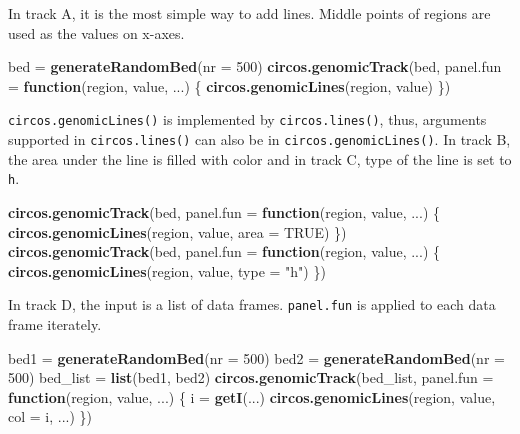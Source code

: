 \documentclass[]{book}
\newenvironment{Shaded}{\begin{snugshade}}{\end{snugshade}}
\newcommand{\KeywordTok}[1]{\textcolor[rgb]{0.13,0.29,0.53}{\textbf{#1}}}
\newcommand{\DataTypeTok}[1]{\textcolor[rgb]{0.13,0.29,0.53}{#1}}
\newcommand{\DecValTok}[1]{\textcolor[rgb]{0.00,0.00,0.81}{#1}}
\newcommand{\StringTok}[1]{\textcolor[rgb]{0.31,0.60,0.02}{#1}}
\newcommand{\OtherTok}[1]{\textcolor[rgb]{0.56,0.35,0.01}{#1}}
\newcommand{\ControlFlowTok}[1]{\textcolor[rgb]{0.13,0.29,0.53}{\textbf{#1}}}
\newcommand{\NormalTok}[1]{#1}
\theoremstyle{definition}
\theoremstyle{definition}
\theoremstyle{remark}
\begin{document}
In track A, it is the most simple way to add lines. Middle points of
regions are used as the values on x-axes.

\begin{Shaded}
\begin{Highlighting}[]
\NormalTok{bed =}\StringTok{ }\KeywordTok{generateRandomBed}\NormalTok{(}\DataTypeTok{nr =} \DecValTok{500}\NormalTok{)}
\KeywordTok{circos.genomicTrack}\NormalTok{(bed, }
    \DataTypeTok{panel.fun =} \ControlFlowTok{function}\NormalTok{(region, value, ...) \{}
        \KeywordTok{circos.genomicLines}\NormalTok{(region, value)}
\NormalTok{\})}
\end{Highlighting}
\end{Shaded}

\texttt{circos.genomicLines()} is implemented by
\texttt{circos.lines()}, thus, arguments supported in
\texttt{circos.lines()} can also be in \texttt{circos.genomicLines()}.
In track B, the area under the line is filled with color and in track C,
type of the line is set to \texttt{h}.

\begin{Shaded}
\begin{Highlighting}[]
\KeywordTok{circos.genomicTrack}\NormalTok{(bed, }
    \DataTypeTok{panel.fun =} \ControlFlowTok{function}\NormalTok{(region, value, ...) \{}
        \KeywordTok{circos.genomicLines}\NormalTok{(region, value, }\DataTypeTok{area =} \OtherTok{TRUE}\NormalTok{)}
\NormalTok{\})}
\KeywordTok{circos.genomicTrack}\NormalTok{(bed, }
    \DataTypeTok{panel.fun =} \ControlFlowTok{function}\NormalTok{(region, value, ...) \{}
        \KeywordTok{circos.genomicLines}\NormalTok{(region, value, }\DataTypeTok{type =} \StringTok{"h"}\NormalTok{)}
\NormalTok{\})}
\end{Highlighting}
\end{Shaded}

In track D, the input is a list of data frames. \texttt{panel.fun} is
applied to each data frame iterately.

\begin{Shaded}
\begin{Highlighting}[]
\NormalTok{bed1 =}\StringTok{ }\KeywordTok{generateRandomBed}\NormalTok{(}\DataTypeTok{nr =} \DecValTok{500}\NormalTok{)}
\NormalTok{bed2 =}\StringTok{ }\KeywordTok{generateRandomBed}\NormalTok{(}\DataTypeTok{nr =} \DecValTok{500}\NormalTok{)}
\NormalTok{bed_list =}\StringTok{ }\KeywordTok{list}\NormalTok{(bed1, bed2)}
\KeywordTok{circos.genomicTrack}\NormalTok{(bed_list, }
    \DataTypeTok{panel.fun =} \ControlFlowTok{function}\NormalTok{(region, value, ...) \{}
\NormalTok{        i =}\StringTok{ }\KeywordTok{getI}\NormalTok{(...)}
        \KeywordTok{circos.genomicLines}\NormalTok{(region, value, }\DataTypeTok{col =}\NormalTok{ i, ...)}
\NormalTok{\})}
\end{Highlighting}
\end{Shaded}
\end{document}
